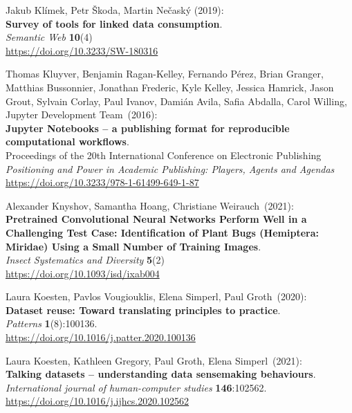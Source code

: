 \begin{thebibliography}{9}
Jakub Klímek, Petr Škoda, Martin Nečaský (2019): \\
\textbf{Survey of tools for linked data consumption}. \\
\emph{Semantic Web} \textbf{10}(4) \\
\url{https://doi.org/10.3233/SW-180316}

Thomas Kluyver, Benjamin Ragan-Kelley, Fernando Pérez, Brian Granger, Matthias Bussonnier, Jonathan Frederic, Kyle Kelley, Jessica Hamrick, Jason Grout, Sylvain Corlay, Paul Ivanov, Damián Avila, Safia Abdalla, Carol Willing, Jupyter Development Team~(2016):\\
\textbf{Jupyter Notebooks – a publishing format for reproducible computational workflows}.\\
Proceedings of the 20th International Conference on Electronic Publishing\\
\emph{Positioning and Power in Academic Publishing: Players, Agents and Agendas}\\ 
\url{https://doi.org/10.3233/978-1-61499-649-1-87}

Alexander Knyshov, Samantha Hoang, Christiane Weirauch~(2021):\\
\textbf{Pretrained Convolutional Neural Networks Perform Well in a Challenging Test Case:
Identification of Plant Bugs (Hemiptera: Miridae) Using a Small Number
of Training Images}. \\
\emph{Insect Systematics and Diversity} \textbf{5}(2)\\
\url{https://doi.org/10.1093/isd/ixab004}

Laura Koesten, Pavlos Vougiouklis, Elena Simperl, Paul Groth~(2020):\\
\textbf{Dataset reuse: Toward translating principles to practice}.\\
\emph{Patterns} \textbf{1}(8):100136.\\
\url{https://doi.org/10.1016/j.patter.2020.100136}

Laura Koesten, Kathleen Gregory, Paul Groth, Elena Simperl~(2021):\\
\textbf{Talking datasets -- understanding data sensemaking
behaviours}.\\
\emph{International journal of human-computer studies}
\textbf{146}:102562.\\
\url{https://doi.org/10.1016/j.ijhcs.2020.102562}


\end{thebibliography}
